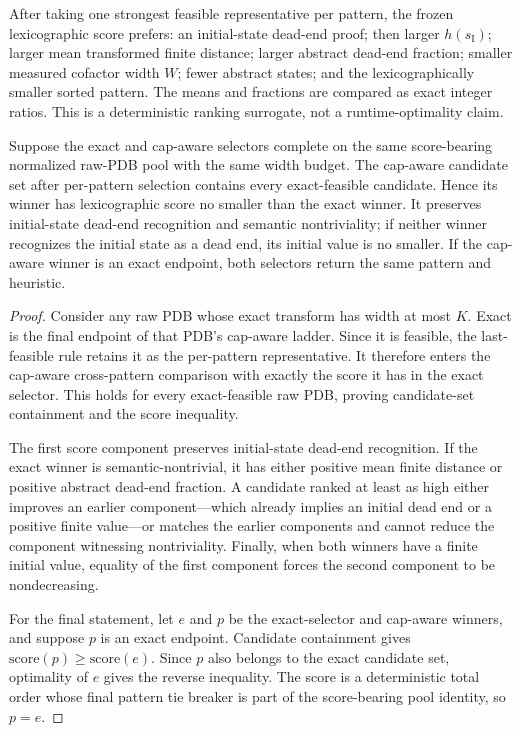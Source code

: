 After taking one strongest feasible representative per pattern, the frozen
lexicographic score prefers: an initial-state dead-end proof; then larger
\(h(s_{\mathrm I})\); larger mean transformed finite distance; larger
abstract dead-end fraction; smaller measured cofactor width \(W\); fewer
abstract states; and the lexicographically smaller sorted pattern.  The means
and fractions are compared as exact integer ratios.  This is a deterministic
ranking surrogate, not a runtime-optimality claim.

\begin{proposition}
\label{prop-selector-dominance}
Suppose the exact and cap-aware selectors complete on the same score-bearing
normalized raw-PDB pool with the same width budget. The cap-aware candidate set after
per-pattern selection contains every exact-feasible candidate. Hence its
winner has lexicographic score no smaller than the exact winner. It preserves
initial-state dead-end recognition and semantic nontriviality; if neither
winner recognizes the initial state as a dead end, its initial value is no
smaller. If the cap-aware winner is an exact endpoint, both selectors return
the same pattern and heuristic.
\end{proposition}

\begin{proof}
Consider any raw PDB whose exact transform has width at most $K$. Exact is
the final endpoint of that PDB's cap-aware ladder. Since it is feasible, the
last-feasible rule retains it as the per-pattern representative. It therefore
enters the cap-aware cross-pattern comparison with exactly the score it has in
the exact selector. This holds for every exact-feasible raw PDB, proving
candidate-set containment and the score inequality.

The first score component preserves initial-state dead-end recognition. If
the exact winner is semantic-nontrivial, it has either positive mean finite
distance or positive abstract dead-end fraction. A candidate ranked at least
as high either improves an earlier component---which already implies an
initial dead end or a positive finite value---or matches the earlier
components and cannot reduce the component witnessing nontriviality. Finally,
when both winners have a finite initial value, equality of the first component
forces the second component to be nondecreasing.

For the final statement, let $e$ and $p$ be the exact-selector and cap-aware
winners, and suppose $p$ is an exact endpoint. Candidate containment gives
$\mathrm{score}(p)\geq\mathrm{score}(e)$. Since $p$ also belongs to the exact
candidate set, optimality of $e$ gives the reverse inequality. The score is a
deterministic total order whose final pattern tie breaker is part of the
score-bearing pool identity, so $p=e$.
\end{proof}

